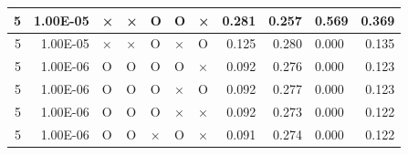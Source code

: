 \documentclass[11pt]{article}
\begin{document}
\begin{longtable}[h]{|r|r|l|l|l|l|l|r|r|l|r|}
5                                 & 1.00E-05                         & ×                                & ×                                & O                                & O                                & ×                                 & 0.281                             & 0.257                             & \multicolumn{1}{r|}{0.569}         & 0.369                               \\ \hline
5                                 & 1.00E-05                         & ×                                & ×                                & O                                & ×                                & O                                 & 0.125                             & 0.280                             & 0.000                              & 0.135                               \\ \hline
5                                 & 1.00E-06                         & O                                & O                                & O                                & O                                & ×                                 & 0.092                             & 0.276                             & 0.000                              & 0.123                               \\ \hline
5                                 & 1.00E-06                         & O                                & O                                & O                                & ×                                & O                                 & 0.092                             & 0.277                             & 0.000                              & 0.123                               \\ \hline
5                                 & 1.00E-06                         & O                                & O                                & O                                & ×                                & ×                                 & 0.092                             & 0.273                             & 0.000                              & 0.122                               \\ \hline
5                                 & 1.00E-06                         & O                                & O                                & ×                                & O                                & ×                                 & 0.091                             & 0.274                             & 0.000                              & 0.122                               \\ \hline

\end{longtable}
\end{document}
